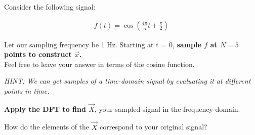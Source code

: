 \begin{enumerate}

\qitem

Consider the following signal:

\begin{align*}
f(t) = \cos(\frac{4\pi}{5}t + \frac{\pi}{2})
\end{align*}

Let our sampling frequency be 1 Hz. Starting at t = 0, {\bf sample $f$ at $N = 5$ points to construct $\vec{x}$. } \\
Feel free to leave your answer in terms of the cosine function.

{\em HINT:
We can get samples of a time-domain signal by evaluating it at different points in time. \\
}


\qitem
{\bf Apply the DFT to find $\vec{X}$}, your sampled signal in the frequency domain.


\qitem
How do the elements of the $\vec{X}$ correspond to your original signal?



\end{enumerate}

